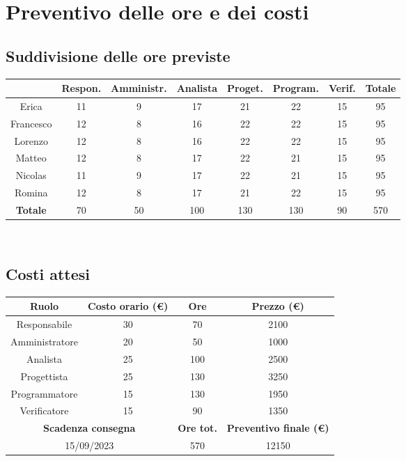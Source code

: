 \documentclass[a4paper, 12pt]{article}
\begin{document}
\newpage

\section{Preventivo delle ore e dei costi}

\subsection{Suddivisione delle ore previste}

\begin{tabular}{|c|c|c|c|c|c|c|c|}
    \hline
    \textbf{} & \textbf{Respon.} & \textbf{Amministr.} & \textbf{Analista} & \textbf{Proget.} & \textbf{Program.} & \textbf{Verif.} & \textbf{Totale}\\
    \hline
    Erica & 11 & 9 & 17 & 21 & 22 & 15 & 95\\
    \hline
    Francesco & 12 & 8 & 16 & 22 & 22 & 15 & 95\\
    \hline
    Lorenzo & 12 & 8 & 16 & 22 & 22 & 15 & 95\\
    \hline
    Matteo & 12 & 8 & 17 & 22 & 21 & 15 & 95\\
    \hline
    Nicolas & 11 & 9 & 17 & 22 & 21 & 15 & 95\\
    \hline
    Romina & 12 & 8 & 17 & 21 & 22 & 15 & 95\\
    \hline
    \textbf{Totale} & 70 & 50 & 100 & 130 & 130 & 90 & 570\\
    \hline
\end{tabular}\\[8pt]

\subsection{Costi attesi}

\begin{tabular}{|c|c|c|c|}
    \hline
    \textbf{Ruolo} & \textbf{Costo orario (\euro)} & \textbf{Ore} & \textbf{Prezzo (\euro)}\\
    \hline
    Responsabile & 30 & 70 & 2100\\
    \hline
    Amministratore & 20 & 50 & 1000\\
    \hline
    Analista & 25 & 100 & 2500\\
    \hline
    Progettista & 25 & 130 & 3250\\
    \hline
    Programmatore & 15 & 130 & 1950\\
    \hline
    Verificatore & 15 & 90 & 1350\\
    \hline\hline
    \multicolumn{2}{|c|}{\textbf{Scadenza consegna}} & \textbf{Ore tot.} & \textbf{Preventivo finale (\euro)}\\
    \hline
    \multicolumn{2}{|c|}{15/09/2023} & 570 & 12150\\
    \hline
\end{tabular}\\[8pt]
\end{document}

